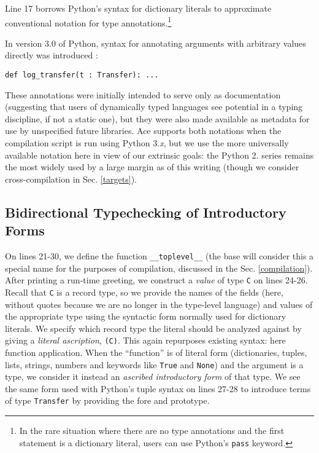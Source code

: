 \documentclass[10pt,preprint]{sigplanconf}
\begin{document}
Line 17 borrows Python's syntax for dictionary literals to approximate  conventional notation for type annotations.\footnote{In the rare situation where there are no type annotations and the first statement is a dictionary literal, users can use Python's \texttt{pass} keyword.} %
 {In version 3.0 of Python, syntax for annotating arguments with arbitrary values directly was introduced \cite{PEP}:
\begin{lstlisting}[numbers=none]
def log_transfer(t : Transfer): ...
\end{lstlisting}
\vspace{-5px}
These annotations were initially intended to serve only as documentation (suggesting that users of dynamically typed languages see potential in a typing discipline, if not a static one), but they were also made available as metadata for use by unspecified  future libraries. Ace supports both notations when the compilation script is run using Python 3.\textit{x}, but we use the more universally available notation here in view of our extrinsic goals: the Python 2. series  remains the most widely used by a large margin as of this writing (though we consider cross-compilation in Sec. \ref{targets}).

\subsection{Bidirectional Typechecking of Introductory Forms}
On lines 21-30, we define the function \verb|__toplevel__| (the base will consider this a special name for the purposes of compilation, discussed in the Sec. \ref{compilation}). After printing a run-time greeting, we construct a \emph{value} of type \verb|C| on lines 24-26. Recall that \verb|C| is a record type, so we provide the names of the fields (here, without quotes because we are no longer in the type-level language) and values of the appropriate type using the syntactic form normally used for dictionary literals. We specify which record type the literal should be {analyzed} against by giving a \emph{literal ascription}, \verb|(C)|. This again repurposes existing  syntax: here function application. When the ``function'' is of literal form (dictionaries, tuples, lists, strings, numbers and keywords like \verb|True| and \verb|None|) and the argument is a type, we consider it instead an \emph{ascribed introductory form} of that type. We see the same form used with Python's tuple syntax on lines 27-28 to introduce terms of type \verb|Transfer| by providing the fore and prototype.

}
\end{document}
